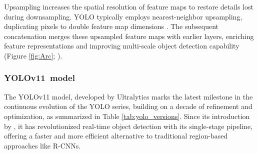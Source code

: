 \documentclass[a4paper,10pt,twocolumn]{article}
\numberwithin{figure}{section}
\numberwithin{table}{section}
\begin{document}
Upsampling increases the spatial resolution of feature maps to restore details lost during downsampling. YOLO typically employs nearest-neighbor upsampling, duplicating pixels to double feature map dimensions \citep{ultralytics2025}. The subsequent concatenation merges these upsampled feature maps with earlier layers, enriching feature representations and improving multi-scale object detection capability (Figure \ref{fig:Arc}; \citealp{hidayatullah2025yolov8yolo11comprehensivearchitecture}).


\vspace{0.3cm}



 \vspace{0.3cm}
\subsubsection{\mbox{YOLOv11 model}}
\vspace{0.3cm}

The YOLOv11 model, developed by Ultralytics marks the latest milestone in the continuous evolution
 of the YOLO series, building on a decade of refinement and optimization,
  as summarized in Table \ref{tab:yolo_versions}. Since its introduction
   by \cite{redmon2016you}, it has revolutionized real-time object
    detection with its single-stage pipeline, offering a faster and
     more efficient alternative to traditional region-based 
     approaches like R-CNNs.
\end{document}
